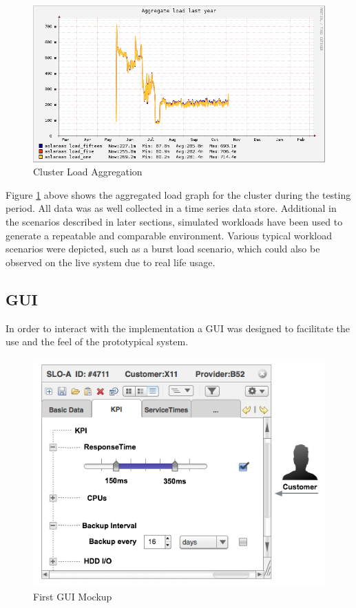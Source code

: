 \begin{figure}[ht]
	\centering
	\includegraphics[width=0.7\linewidth]{chapters/chapter5/fig/monidataloadlast}
	\caption{Cluster Load Aggregation}
	\label{fig:monidata2}
\end{figure}

Figure \ref{fig:monidata2} above shows the aggregated load graph for the cluster during the testing period. All data was as well collected in a time series data store. Additional in the scenarios described in later sections, simulated workloads have been used to generate a repeatable and comparable environment. Various typical workload scenarios were depicted, such as a burst load scenario, which could also be observed on the live system due to real life usage.


\subsection{GUI}
In order to interact with the implementation a GUI was designed to facilitate the use and the feel of the prototypical system.

\begin{figure}[ht]
	\centering
	\includegraphics[width=0.7\linewidth]{chapters/chapter5/fig/GUI}
	\caption{First GUI Mockup}
	\label{fig:gui}
\end{figure}


